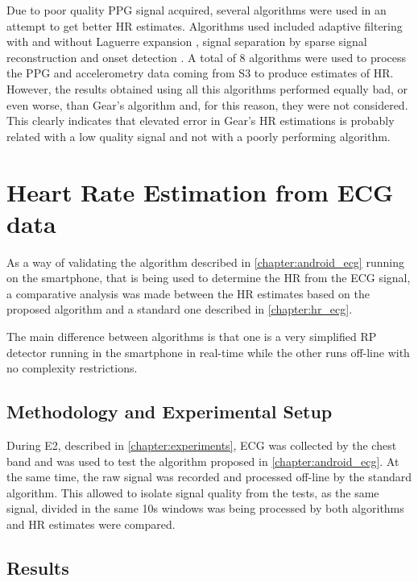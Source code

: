 Due to poor quality PPG signal acquired, several algorithms were used in an attempt to get better HR estimates.
Algorithms used included adaptive filtering with and without Laguerre expansion \cite{adagibbs2005active,laguerrewood2006active}, signal separation by sparse signal reconstruction \cite{zhang2015joss,zhang2015troika} and onset detection \cite{bvponsetblazek2010multi}. A total of 8 algorithms were used to process the PPG and accelerometry data coming from S3 to produce estimates of HR. However, the results obtained using all this algorithms performed equally bad, or even worse, than Gear's algorithm and, for this reason, they were not considered. This clearly indicates that elevated error in Gear's HR estimations is probably related with a low quality signal and not with a poorly performing algorithm.

\FloatBarrier

\section{Heart Rate Estimation from ECG data}
\label{chapter:android_ecg_testing}

As a way of validating the algorithm described in \cref{chapter:android_ecg} running on the smartphone, that is being used to determine the HR from the ECG signal, a comparative analysis was made between the HR estimates based on the proposed algorithm and a standard one described in \cref{chapter:hr_ecg}.

The main difference between algorithms is that one is a very simplified RP detector running in the smartphone in real-time while the other runs off-line with no complexity restrictions.

\subsection{Methodology and Experimental Setup}

During E2, described in \cref{chapter:experiments}, ECG was collected by the chest band and was used to test the algorithm proposed in \cref{chapter:android_ecg}. At the same time, the raw signal was recorded and processed off-line by the standard algorithm. This allowed to isolate signal quality from the tests, as the same signal, divided in the same 10s windows was being processed by both algorithms and HR estimates were compared.

\FloatBarrier
\subsection{Results}

